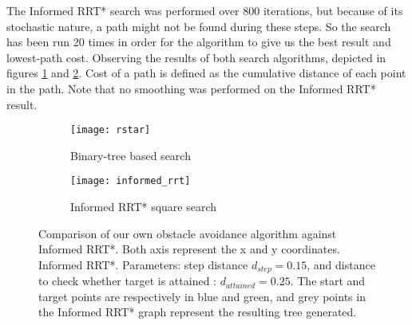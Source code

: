 The Informed RRT* search was performed over 800 iterations, but because of its stochastic nature, a path might not be found
during these steps. So the search has been run 20 times in order for the algorithm to give us the best result and lowest-path cost.
Observing the results of both search algorithms, depicted in figures \ref{fig:own-obs-avoid} and \ref{fig:informed-rrt-star}.
Cost of a path is defined as the cumulative distance of each point in the path. Note that no smoothing was performed on the Informed RRT* result.

\begin{figure}[h]
    \centering
    \begin{subfigure}[c][][c]{0.4\linewidth}
        \texttt{[image: rstar]}
        \caption{Binary-tree based search}
        \label{fig:own-obs-avoid}
    \end{subfigure}
    \hfill
    \begin{subfigure}[c][][c]{0.4\linewidth}
        \texttt{[image: informed\_rrt]}
        \caption{Informed RRT* square search}
        \label{fig:informed-rrt-star}
    \end{subfigure}
    \label{fig:avoidance}
    \caption{Comparison of our own obstacle avoidance algorithm against Informed RRT*. Both axis represent the x and y coordinates.
    Informed RRT*. Parameters: step distance $d_{step} = 0.15$, and distance to check whether target is attained : $d_{attained} = 0.25$.
    The start and target points are respectively in blue and green,
    and grey points in the Informed RRT* graph represent the resulting tree generated.}
\end{figure}